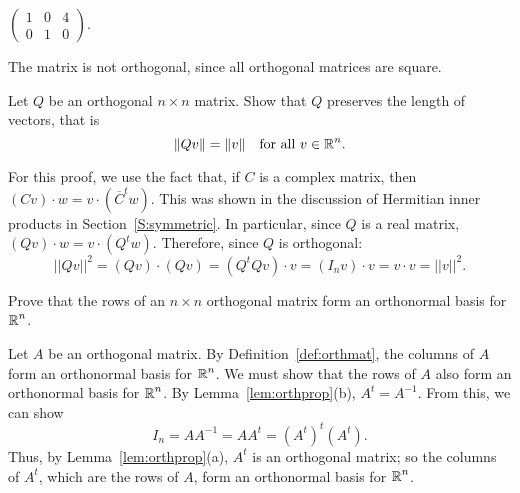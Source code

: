 \documentclass{ximera}
\begin{document}
\begin{exercise} \label{c7.9.1e}
$\left(\begin{array}{rrr} 1 & 0 & 4\\ 0 & 1 & 0
\end{array}\right)$.

\begin{solution}
The matrix is not orthogonal, since all orthogonal matrices
are square.

\end{solution}
\end{exercise}

\begin{exercise} \label{c7.9.2}
Let $Q$ be an orthogonal $n\times n$ matrix.
Show that $Q$ preserves the length of vectors, that is
\[
\|Qv\| = \|v\|\quad \mbox{for all $v\in\mbox{$\Bbb{R}$}^n$.}
\]

\begin{solution}

For this proof, we use the fact that, if $C$ is a complex matrix, then
$(Cv) \cdot w = v \cdot (\overline{C}^tw)$.  This was shown in the discussion
of Hermitian inner products in Section~\ref{S:symmetric}.  In particular,
since $Q$ is a real matrix, $(Qv) \cdot w = v \cdot (Q^tw)$.  Therefore,
since $Q$ is orthogonal:
\[
||Qv||^2 = (Qv) \cdot (Qv) = (Q^tQv) \cdot v = (I_nv) \cdot v
= v \cdot v = ||v||^2.
\]


\end{solution}
\end{exercise}

\begin{exercise}  \label{c7.9.45}
Prove that the rows of an $n\times n$ orthogonal matrix form an orthonormal
basis for $\mbox{$\Bbb{R}$}^n$.

\begin{solution}

Let $A$ be an orthogonal matrix.  By
Definition~\ref{def:orthmat}, the columns of $A$ form an orthonormal
basis for $\mbox{$\Bbb{R}$}^n$.  We must show that the rows of $A$ also form an
orthonormal basis for $\mbox{$\Bbb{R}$}^n$.  By Lemma~\ref{lem:orthprop}(b), $A^t =
A^{-1}$.  From this, we can show
\[
I_n = AA^{-1} = AA^t = (A^t)^t(A^t).
\]
Thus, by Lemma~\ref{lem:orthprop}(a), $A^t$ is an orthogonal matrix;
so the columns of $A^t$, which are the rows of $A$, form an orthonormal
basis for $\mbox{$\Bbb{R}$}^n$.

\end{solution}
\end{exercise}


\CEXER
\end{document}
